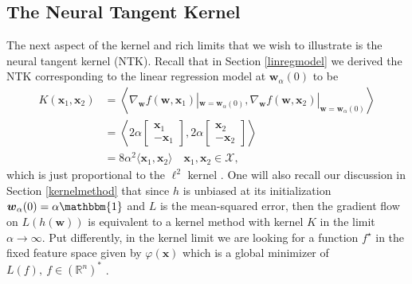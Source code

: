 \documentclass{article}
\begin{document}
\subsection{The Neural Tangent Kernel}\label{visualizeNTK}

The next aspect of the kernel and rich limits that we wish to illustrate is the neural tangent kernel (NTK). Recall that in Section \ref{linregmodel} we derived the NTK corresponding to the linear regression model at $\boldsymbol{w}_{\alpha}(0)$ to be
\begin{align*}
K(\boldsymbol{x}_1, \boldsymbol{x}_2) &= \left\langle \nabla_{\boldsymbol{w}}f(\boldsymbol{w}, \boldsymbol{x}_1)|_{\boldsymbol{w} = \boldsymbol{w}_{\alpha}(0)}, \nabla_{\boldsymbol{w}}f(\boldsymbol{w}, \boldsymbol{x}_2)|_{\boldsymbol{w} = \boldsymbol{w}_{\alpha}(0)} \right\rangle\\
&= \left\langle 2\alpha 
    \begin{bmatrix}
        \boldsymbol{x}_1\\
        -\boldsymbol{x}_1
    \end{bmatrix}, 2\alpha 
    \begin{bmatrix}
        \boldsymbol{x}_2\\
        -\boldsymbol{x}_2
    \end{bmatrix} \right\rangle\\
&= 8\alpha^2 \langle \boldsymbol{x}_1, \boldsymbol{x}_2 \rangle \quad \boldsymbol{x}_1, \boldsymbol{x}_2 \in \mathcal{X},
\end{align*}
which is just proportional to the $\ell^2$ kernel \cite{woodworth2020kernel}. One will also recall our discussion in Section \ref{kernelmethod} that since $h$ is unbiased at its initialization $\boldsymbol{w}_{\alpha}(0) = \alpha \mathbbm{1}$ and $L$ is the mean-squared error, then the gradient flow on $L(h(\boldsymbol{w}))$ is equivalent to a kernel method with kernel $K$ in the limit $\alpha \rightarrow \infty$. Put differently, in the kernel limit we are looking for a function $f^{\star}$ in the fixed feature space given by $\varphi(\boldsymbol{x})$ which is a global minimizer of $L(f), \ f \in (\mathbb{R}^n)^*$ \cite{wei2019regularization}.
\end{document}
